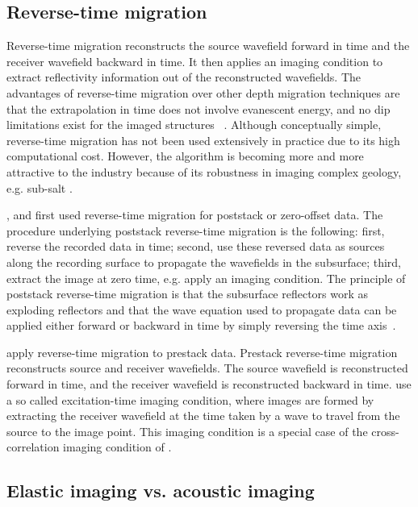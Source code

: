 \subsection{Reverse-time migration}

Reverse-time migration reconstructs the source wavefield forward in
time and the receiver wavefield backward in time. It then applies an
imaging condition to extract reflectivity information out of the
reconstructed wavefields.  The advantages of reverse-time migration
over other depth migration techniques are that the extrapolation in
time does not involve evanescent energy, and no dip limitations exist
for the imaged structures
~\cite[]{mcmechan:613,mcmechan:413,whitmore:382,GEO48-11-15141524}. Although
conceptually simple, reverse-time migration has not been used
extensively in practice due to its high computational cost. However,
the algorithm is becoming more and more attractive to the industry
because of its robustness in imaging complex geology, e.g. sub-salt
\cite[]{jones:2140,boechat:2427}.

\cite{mcmechan:613,mcmechan:413}, \cite{whitmore:382} and
\cite{GEO48-11-15141524} first used reverse-time migration for
poststack or zero-offset data. The procedure underlying poststack
reverse-time migration is the following: first, reverse the recorded
data in time; second, use these reversed data as sources along the
recording surface to propagate the wavefields in the subsurface;
third, extract the image at zero time, e.g. apply an imaging
condition. The principle of poststack reverse-time migration is that
the subsurface reflectors work as exploding reflectors and that the
wave equation used to propagate data can be applied either forward or
backward in time by simply reversing the time axis~\cite[]{levin:581}.

\cite{chang:67} apply reverse-time migration to prestack
data. Prestack reverse-time migration reconstructs source and receiver
wavefields. The source wavefield is reconstructed forward in time, and
the receiver wavefield is reconstructed backward in
time. \cite{chang:67,chang:597} use a so called excitation-time
imaging condition, where images are formed by extracting the receiver
wavefield at the time taken by a wave to travel from the source to the
image point. This imaging condition is a special case of the
cross-correlation imaging condition of \cite{GEO36-03-04670481}.

\subsection{Elastic imaging vs. acoustic imaging }

